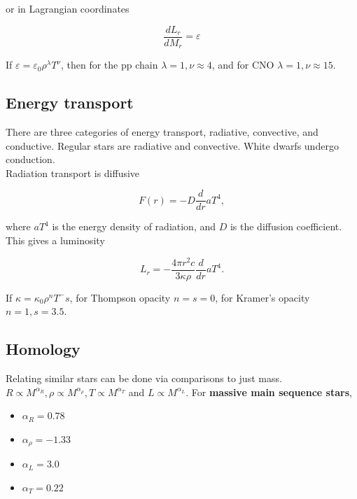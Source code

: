 \documentclass{article}
\begin{document}
or in Lagrangian coordinates

\begin{equation}
    \boxed{\frac{dL_r}{dM_r} = \varepsilon}
\end{equation}

If $\varepsilon = \varepsilon_0 \rho^\lambda T^\nu$, then for the pp chain $\lambda = 1, \nu \approx 4$, and for CNO $\lambda = 1, \nu \approx 15$.

\subsection{Energy transport}

There are three categories of energy transport, radiative, convective, and conductive. Regular stars are radiative and convective. White dwarfs undergo conduction.\\

Radiation transport is diffusive

\begin{equation}
    F(r) = -D\frac{d}{dr} aT^4,
\end{equation}

where $aT^4$ is the energy density of radiation, and $D$ is the diffusion coefficient. This gives a luminosity

\begin{equation}
    L_r = -\frac{4\pi r^2 c}{3\kappa \rho} \frac{d}{dr}aT^4.
\end{equation}

If $\kappa = \kappa_0 \rho^n T^-s$, for Thompson opacity $n=s=0$, for Kramer's opacity $n = 1, s = 3.5$.

\subsection{Homology}

Relating similar stars can be done via comparisons to just mass. $R\propto M^{\alpha_R}, \rho\propto M^{\alpha_\rho}, T\propto M^{\alpha_T}$ and $L\propto M^{\alpha_L}$. For \textbf{massive main sequence stars},

\begin{itemize}
    \item $\alpha_R = 0.78$
    \item $\alpha_\rho = -1.33$
    \item $\alpha_L = 3.0$
    \item $\alpha_T = 0.22$
\end{itemize}
\end{document}
